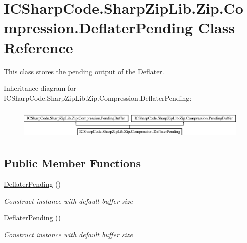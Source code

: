 \hypertarget{class_i_c_sharp_code_1_1_sharp_zip_lib_1_1_zip_1_1_compression_1_1_deflater_pending}{}\section{I\+C\+Sharp\+Code.\+Sharp\+Zip\+Lib.\+Zip.\+Compression.\+Deflater\+Pending Class Reference}
\label{class_i_c_sharp_code_1_1_sharp_zip_lib_1_1_zip_1_1_compression_1_1_deflater_pending}


This class stores the pending output of the \hyperlink{class_i_c_sharp_code_1_1_sharp_zip_lib_1_1_zip_1_1_compression_1_1_deflater}{Deflater}.  


Inheritance diagram for I\+C\+Sharp\+Code.\+Sharp\+Zip\+Lib.\+Zip.\+Compression.\+Deflater\+Pending\+:\begin{figure}[H]
\begin{center}
\leavevmode
\includegraphics[height=1.534247cm]{class_i_c_sharp_code_1_1_sharp_zip_lib_1_1_zip_1_1_compression_1_1_deflater_pending}
\end{center}
\end{figure}
\subsection*{Public Member Functions}
\begin{DoxyCompactItemize}
\item 
\hyperlink{class_i_c_sharp_code_1_1_sharp_zip_lib_1_1_zip_1_1_compression_1_1_deflater_pending_a4f1b86f1724cb3fe53c3559e5f2e5484}{Deflater\+Pending} ()
\begin{DoxyCompactList}\small\item\em Construct instance with default buffer size \end{DoxyCompactList}\item 
\hyperlink{class_i_c_sharp_code_1_1_sharp_zip_lib_1_1_zip_1_1_compression_1_1_deflater_pending_a4f1b86f1724cb3fe53c3559e5f2e5484}{Deflater\+Pending} ()
\begin{DoxyCompactList}\small\item\em Construct instance with default buffer size \end{DoxyCompactList}\end{DoxyCompactItemize}

